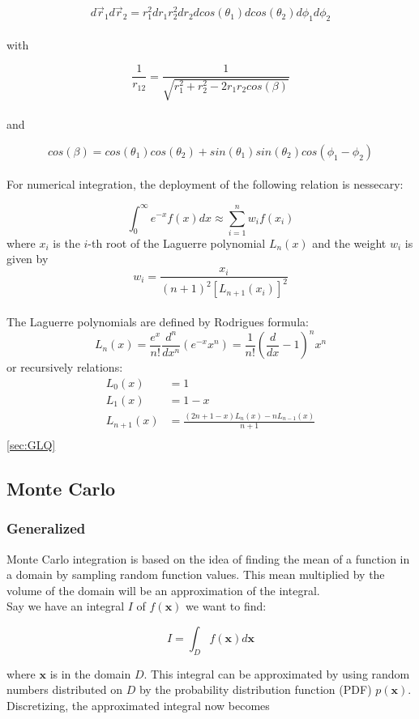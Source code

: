 \documentclass[../main.tex]{subfiles}
\begin{document}
\[ d\vec{r}_1 d\vec{r}_2 = r_1^2 dr_1 r_2^2 dr_2 dcos(\theta_1) dcos(\theta_2) d\phi_1 d\phi_2\]
\\
with

\[\frac{1}{r_{12}} = \frac{1}{\sqrt{r_1^2 + r_2^2 - 2r_1r_2cos(\beta)}} \]
\\and


\[cos(\beta) = cos(\theta_1)cos(\theta_2) + sin(\theta_1)sin(\theta_2)cos(\phi_1 - \phi_2)\]
\\

For numerical integration, the deployment of the following relation is nessecary:

\[\int_0^\infty e^{-x}f(x)dx \approx \sum_{i=1}^n w_i f(x_i)\]
where $x_i$ is the $i$-th root of the Laguerre polynomial $L_n(x)$ and the weight $w_i$ is given by
\\
\[w_i = \frac{x_i}{(n+1)^2 [L_{n+1}(x_i)]^2}\]
\\
The Laguerre polynomials are defined by Rodrigues formula:
\[L_n(x) = \frac{e^x}{n!}\frac{d^n}{dx^n}\left(e^{-x} x^n\right) = \frac{1}{n!}\left(\frac{d}{dx}-1\right)^n x^n\]
or recursively relations:
\begin{align*}
  L_0(x) &= 1\\
  L_1(x) &= 1 - x\\
  L_{n+1}(x) &= \frac{(2n + 1 - x)L_n(x) - nL_{n-1}(x)}{n+1}\\
\end{align*}
\ref{sec:GLQ}


\subsection{Monte Carlo}
\subsubsection{Generalized}
\label{sec:MC}
Monte Carlo integration is based on the idea of finding the mean of a function in a domain by sampling random function values. This mean multiplied by the volume of the domain will be an approximation of the integral. \\

Say we have an integral $I$ of $f(\mathbf x)$ we want to find:

\begin{equation*}
  I=\int_D f(\mathbf x)d\mathbf x
\end{equation*}

where $\mathbf{x}$ is in the domain $D$. This integral can be approximated by using random numbers distributed on $D$ by the probability distribution function (PDF) $p(\mathbf x)$. Discretizing, the approximated integral now becomes
\end{document}
